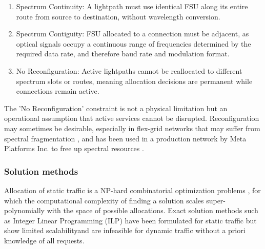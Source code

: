 
\begin{enumerate}[itemsep=0pt]
    \item Spectrum Continuity: A lightpath must use identical FSU along its entire route from source to destination, without wavelength conversion.
    \item Spectrum Contiguity: FSU allocated to a connection must be adjacent, as optical signals occupy a continuous range of frequencies determined by the required data rate, and therefore baud rate and modulation format.
    \item No Reconfiguration: Active lightpaths cannot be reallocated to different spectrum slots or routes, meaning allocation decisions are permanent while connections remain active.
\end{enumerate}

The 'No Reconfiguration' constraint is not a physical limitation but an operational assumption that active services cannot be disrupted. Reconfiguration may sometimes be desirable, especially in flex-grid networks that may suffer from spectral fragmentation \cite{gerstel_elastic_2012}, and has been used in a production network by Meta Platforms Inc. to free up spectral resources \cite{balasubramanian_targeted_2023}.



\subsubsection*{Solution methods}


Allocation of static traffic is a NP-hard combinatorial optimization problems \cite{chlamtac_lightpath_1992}, for which the computational complexity of finding a solution scales super-polynomially with the space of possible allocations. Exact solution methods such as Integer Linear Programming (ILP) have been formulated for static traffic \cite{walkowiak_ilp_2016,jaumard_decomposition_2023} but show limited scalability\footnotemark and are infeasible for dynamic traffic without a priori knowledge of all requests. 

